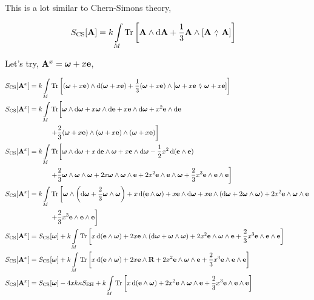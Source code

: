 This is a lot similar to Chern-Simons theory,

\begin{align*}
    S_{\textnormal{CS}}\qty[\vb A]&=k\int\limits_M\Tr\qty[\vb A\wedge\dd{\vb A}+\frac13\vb A\wedge\wedgecomm{\vb A}{\vb A}]
\end{align*}

Let's try, $\vb A^x=\boldsymbol\omega+x\vb e$,

\begin{align*}
    S_{\textnormal{CS}}\qty[\vb A^x]&=k\int\limits_M\Tr\qty[\qty(\boldsymbol\omega+x\vb e)\wedge\dd{\qty(\boldsymbol\omega+x\vb e)}+\frac13\qty(\boldsymbol\omega+x\vb e)\wedge\wedgecomm{\boldsymbol\omega+x\vb e}{\boldsymbol\omega+x\vb e}]\\
    S_{\textnormal{CS}}\qty[\vb A^x]&=k\int\limits_M\Tr\biggl[\boldsymbol\omega\wedge\dd{\boldsymbol\omega}+x\boldsymbol\omega\wedge\dd{\vb e}+x\vb e\wedge\dd{\boldsymbol\omega}+x^2\vb e\wedge\dd{\vb e}\\
    &\quad\quad\quad\left.+\frac23\qty(\boldsymbol\omega+x\vb e)\wedge\qty(\boldsymbol\omega+x\vb e)\wedge\qty(\boldsymbol\omega+x\vb e)\right]\\
    S_{\textnormal{CS}}\qty[\vb A^x]&=k\int\limits_M\Tr\biggl[\boldsymbol\omega\wedge\dd{\boldsymbol\omega}+x\dd{\vb e}\wedge\boldsymbol\omega+x\vb e\wedge\dd{\boldsymbol\omega}-\frac12x^2\dd{\qty(\vb e\wedge\vb e)}\\
    &\quad\quad\quad\left.+\frac23\boldsymbol\omega\wedge\boldsymbol\omega\wedge\boldsymbol\omega+2x\boldsymbol\omega\wedge\boldsymbol\omega\wedge\vb e+2x^2\vb e\wedge\vb e\wedge \boldsymbol\omega+\frac23x^3\vb e\wedge\vb e\wedge\vb e\right]\\
    S_{\textnormal{CS}}\qty[\vb A^x]&=k\int\limits_M\Tr\left[\boldsymbol\omega\wedge\qty(\dd{\boldsymbol\omega}+\frac23\boldsymbol\omega\wedge\boldsymbol\omega)+x\dd{\qty(\vb e\wedge\boldsymbol\omega)}+x\vb e\wedge\dd{\boldsymbol\omega}+x\vb e\wedge\qty(\dd{\boldsymbol\omega}+2\boldsymbol\omega\wedge\boldsymbol\omega)+2x^2\vb e\wedge\boldsymbol\omega\wedge\vb e\right.\\
    &\quad\quad\quad\left.+\frac23x^3\vb e\wedge\vb e\wedge\vb e\right]\\
    S_{\textnormal{CS}}\qty[\vb A^x]&=S_{\textnormal{CS}}\qty[\boldsymbol\omega]+k\int\limits_M\Tr\qty[x\dd{\qty(\vb e\wedge\boldsymbol\omega)}+2x\vb e\wedge\qty(\dd{\boldsymbol\omega}+\boldsymbol\omega\wedge\boldsymbol\omega)+2x^2\vb e\wedge\boldsymbol\omega\wedge\vb e+\frac23x^3\vb e\wedge\vb e\wedge\vb e]\\
    S_{\textnormal{CS}}\qty[\vb A^x]&=S_{\textnormal{CS}}\qty[\boldsymbol\omega]+k\int\limits_M\Tr\qty[x\dd{\qty(\vb e\wedge\boldsymbol\omega)}+2x\vb e\wedge\vb R+2x^2\vb e\wedge\boldsymbol\omega\wedge\vb e+\frac23x^3\vb e\wedge\vb e\wedge\vb e]\\
    S_{\textnormal{CS}}\qty[\vb A^x]&=S_{\textnormal{CS}}\qty[\boldsymbol\omega]-4xk\kappa S_{\textnormal{EH}}+k\int\limits_M\Tr\qty[x\dd{\qty(\vb e\wedge\boldsymbol\omega)}+2x^2\vb e\wedge\boldsymbol\omega\wedge\vb e+\frac23x^3\vb e\wedge\vb e\wedge\vb e]
\end{align*}

